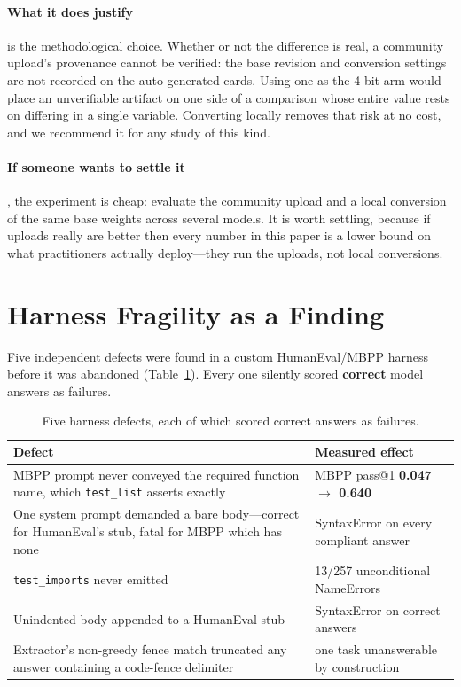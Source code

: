 \documentclass[11pt]{article}
\begin{document}
\paragraph{What it does justify} is the methodological choice. Whether or not the
difference is real, a community upload's provenance cannot be verified: the base revision
and conversion settings are not recorded on the auto-generated cards. Using one as the
4-bit arm would place an unverifiable artifact on one side of a comparison whose entire
value rests on differing in a single variable. Converting locally removes that risk at no
cost, and we recommend it for any study of this kind.

\paragraph{If someone wants to settle it}, the experiment is cheap: evaluate the community
upload and a local conversion of the same base weights across several models. It is worth
settling, because if uploads really are better then every number in this paper is a lower
bound on what practitioners actually deploy---they run the uploads, not local conversions.

\section{Harness Fragility as a Finding}
\label{sec:harnessfragility}

Five independent defects were found in a custom HumanEval/MBPP harness before it was
abandoned (Table~\ref{tab:defects}). Every one silently scored \textbf{correct} model
answers as failures.

\begin{table}[h]
  \centering
  \caption{Five harness defects, each of which scored correct answers as failures.}
  \label{tab:defects}
  \smallskip
  \small
  \begin{tabular}{p{}p{}}
    \toprule
    Defect & Measured effect \\
    \midrule
    MBPP prompt never conveyed the required function name, which \texttt{test\_list}
      asserts exactly & MBPP pass@1 \textbf{0.047 $\to$ 0.640} \\
    One system prompt demanded a bare body---correct for HumanEval's stub, fatal for
      MBPP which has none & SyntaxError on every compliant answer \\
    \texttt{test\_imports} never emitted & 13/257 unconditional NameErrors \\
    Unindented body appended to a HumanEval stub & SyntaxError on correct answers \\
    Extractor's non-greedy fence match truncated any answer containing a code-fence
      delimiter & one task unanswerable by construction \\
    \bottomrule
  \end{tabular}
\end{table}
\end{document}
